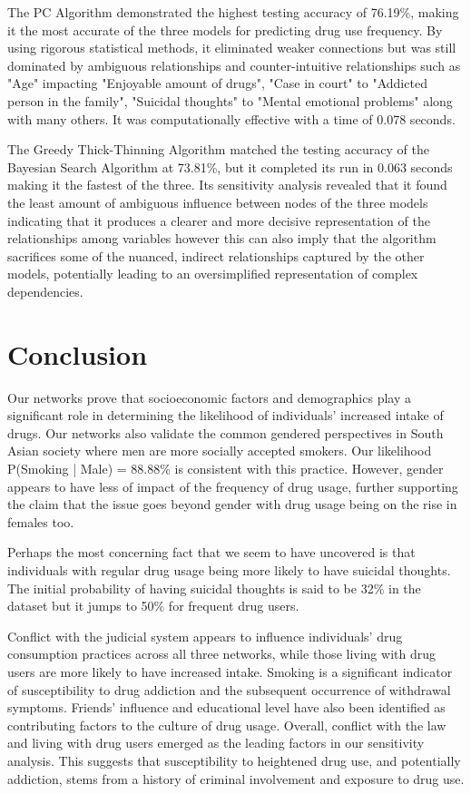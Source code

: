 \documentclass[conference]{IEEEtran}
\begin{document}
The PC Algorithm demonstrated the highest testing accuracy of 76.19\%, making it the most accurate of the three models for predicting drug use frequency. By using rigorous statistical methods, it eliminated weaker connections but was still dominated by ambiguous relationships and counter-intuitive relationships such as "Age" impacting "Enjoyable amount of drugs", "Case in court" to "Addicted person in the family", "Suicidal thoughts" to "Mental emotional problems" along with many others. It was computationally effective with a time of 0.078 seconds.

The Greedy Thick-Thinning Algorithm matched the testing accuracy of the Bayesian Search Algorithm at  73.81\%, but it completed its run in 0.063 seconds making it the fastest of the three. Its sensitivity analysis revealed that it found the least amount of ambiguous influence between nodes of the three models indicating that it produces a clearer and more decisive representation of the relationships among variables however this can also imply that the algorithm sacrifices some of the nuanced, indirect relationships captured by the other models, potentially leading to an oversimplified representation of complex dependencies.

\section{Conclusion}
Our networks prove that socioeconomic factors and demographics play a significant role in determining the likelihood of individuals' increased intake of drugs. Our networks also validate the common gendered perspectives in South Asian society where men are more socially accepted smokers. Our likelihood P(Smoking | Male) = 88.88\% is consistent with this practice. However, gender appears to have less of impact of the frequency of drug usage, further supporting the claim that the issue goes beyond gender with drug usage being on the rise in females too. 

Perhaps the most concerning fact that we seem to have uncovered is that individuals with regular drug usage being more likely to have suicidal thoughts. The initial probability of having suicidal thoughts is said to be 32\% in the dataset but it jumps to 50\% for frequent drug users.

Conflict with the judicial system appears to influence individuals' drug consumption practices across all three networks, while those living with drug users are more likely to have increased intake. Smoking is a significant indicator of susceptibility to drug addiction and the subsequent occurrence of withdrawal symptoms. Friends' influence and educational level have also been identified as contributing factors to the culture of drug usage. Overall, conflict with the law and living with drug users emerged as the leading factors in our sensitivity analysis. This suggests that susceptibility to heightened drug use, and potentially addiction, stems from a history of criminal involvement and exposure to drug use.
\end{document}
